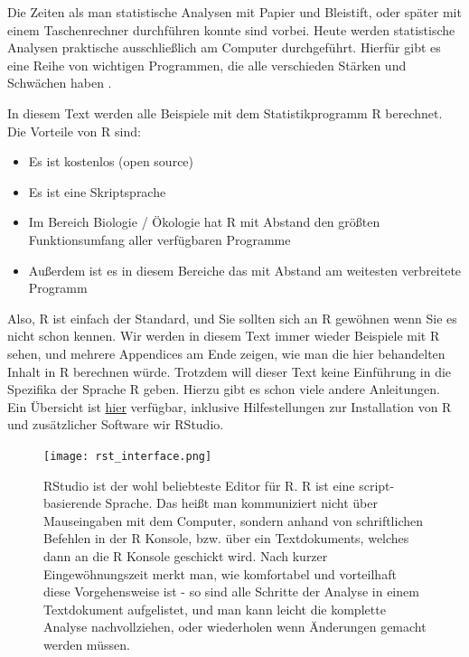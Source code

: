 \documentclass[a4paper,twoside]{tufte-book}\usepackage[]{graphicx}\usepackage[]{color}
\begin{document}
	Die Zeiten als man statistische Analysen mit Papier und Bleistift, oder später mit einem Taschenrechner durchführen konnte sind vorbei. Heute werden statistische Analysen praktische ausschließlich am Computer durchgeführt. Hierfür gibt es eine Reihe von wichtigen Programmen, die alle verschieden Stärken und Schwächen haben .
	
	In diesem Text werden alle Beispiele mit dem Statistikprogramm R berechnet. Die Vorteile von R sind:
	
		\begin{itemize}
		\item Es ist kostenlos (open source)
		\item Es ist eine Skriptsprache 
		\item Im Bereich Biologie / Ökologie hat R mit Abstand den größten Funktionsumfang aller verfügbaren Programme
		\item Außerdem ist es in diesem Bereiche das mit Abstand am weitesten verbreitete Programm
	\end{itemize}
	

Also, R ist einfach der Standard, und Sie sollten sich an R gewöhnen wenn Sie es nicht schon kennen. Wir werden in diesem Text immer wieder Beispiele mit R sehen, und mehrere Appendices am Ende zeigen, wie man die hier behandelten Inhalt in R berechnen würde. Trotzdem will dieser Text keine Einführung in die Spezifika der Sprache R geben. Hierzu gibt es schon viele andere Anleitungen. Ein Übersicht ist  \href{http://biometry.github.io/APES/R/R10-gettingStarted.html}{hier} verfügbar, inklusive Hilfestellungen zur Installation von R und zusätzlicher Software wir RStudio.
	
	\begin{figure}[]
		\begin{center}
			\texttt{[image: rst\_interface.png]}
			\caption{RStudio ist der wohl beliebteste Editor für R. R ist eine script-basierende Sprache. Das heißt man kommuniziert nicht über Mauseingaben mit dem Computer, sondern anhand von schriftlichen Befehlen in der R Konsole, bzw. über ein Textdokuments, welches dann an die R Konsole geschickt wird. Nach kurzer Eingewöhnungszeit merkt man, wie komfortabel und vorteilhaft diese Vorgehensweise ist - so sind alle Schritte der Analyse in einem Textdokument aufgelistet, und man kann leicht die komplette Analyse nachvollziehen, oder wiederholen wenn Änderungen gemacht werden müssen.}
			\label{fig: Rstudio1}
		\end{center}
	\end{figure}
	
\end{document}
